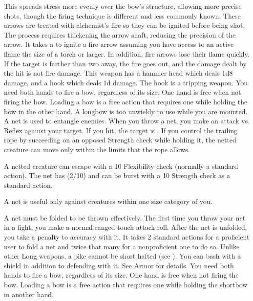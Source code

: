         This spreads stress more evenly over the bow's structure, allowing more precise shots, though the firing technique is different and less commonly known.
         These arrows are treated with alchemist's fire so they can be ignited before being shot.
        The process requires thickening the arrow shaft, reducing the precision of the arrow.
        It takes a  to ignite a fire arrow assuming you have access to an active flame the size of a torch or larger.
        In addition, fire arrows lose their flame quickly.
        If the target is farther than two  away, the fire goes out, and the damage dealt by the hit is not fire damage.
         This weapon has a hammer head which deals 1d8 damage, and a hook which deals \minus1d damage. The hook is a tripping weapon.
         You need both hands to fire a bow, regardless of its size. One hand is free when not firing the bow. Loading a bow is a free action that requires one  while holding the bow in the other hand. A longbow is too unwieldy to use while you are mounted.
         A net is used to entangle enemies. When you throw a net, you make an attack vs. Reflex against your target. If you hit, the target is \slowed. If you control the trailing rope by succeeding on an opposed Strength check while holding it, the netted creature can move only within the limits that the rope allows.
        \par A netted creature can escape with a  10 Flexibility check (normally a standard action). The net has (2/10) and can be burst with a  10 Strength check as a standard action.
        \par A net is useful only against creatures within one size category of you.
        \par A net must be folded to be thrown effectively. The first time you throw your net in a fight, you make a normal ranged touch attack roll. After the net is unfolded, you take a  penalty to accuracy with it. It takes 2 standard actions for a proficient user to fold a net and twice that many for a nonproficient one to do so.
         Unlike other Long weapons, a pike cannot be short hafted (see ).
         You can bash with a shield in addition to defending with it. See Armor for details.
         You need both hands to fire a bow, regardless of its size. One hand is free when not firing the bow. Loading a bow is a free action that requires one  while holding the shortbow in another hand.
